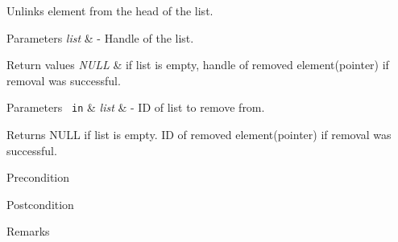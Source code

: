 Unlinks element from the head of the list. 


\begin{DoxyParams}{Parameters}
{\em list} & -\/ Handle of the list.\\
\hline
\end{DoxyParams}

\begin{DoxyRetVals}{Return values}
{\em N\+U\+LL} & if list is empty, handle of removed element(pointer) if removal was successful.\\
\hline
\end{DoxyRetVals}


 
\begin{DoxyParams}[1]{Parameters}
\mbox{\texttt{ in}}  & {\em list} & -\/ ID of list to remove from.\\
\hline
\end{DoxyParams}
\begin{DoxyReturn}{Returns}
N\+U\+LL if list is empty. ID of removed element(pointer) if removal was successful.
\end{DoxyReturn}
\begin{DoxyPrecond}{Precondition}

\end{DoxyPrecond}
\begin{DoxyPostcond}{Postcondition}

\end{DoxyPostcond}
\begin{DoxyRemark}{Remarks}
\begin{DoxyVerb}\end{DoxyVerb}
 
\end{DoxyRemark}
